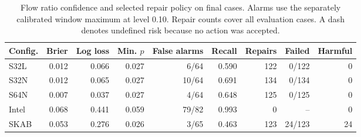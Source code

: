 \begin{table}[t]
\centering
\caption{Flow ratio confidence and selected repair policy on final cases. Alarms use the separately calibrated window maximum at level 0.10. Repair counts cover all evaluation cases. A dash denotes undefined risk because no action was accepted.}
\label{tab:confidence}
\small
\begin{tabular}{lrrrrrrrr}
\toprule
Config. & Brier & Log loss & Min. $p$ & False alarms & Recall & Repairs & Failed & Harmful \\
\midrule
S32L & 0.012 & 0.066 & 0.027 & 6/64 & 0.590 & 122 & 0/122 & 0 \\
S32N & 0.012 & 0.065 & 0.027 & 10/64 & 0.691 & 134 & 0/134 & 0 \\
S64N & 0.007 & 0.037 & 0.027 & 4/64 & 0.648 & 125 & 0/125 & 0 \\
Intel & 0.068 & 0.441 & 0.059 & 79/82 & 0.993 & 0 & -- & 0 \\
SKAB & 0.053 & 0.276 & 0.026 & 3/65 & 0.463 & 123 & 24/123 & 24 \\
\bottomrule
\end{tabular}
\end{table}

